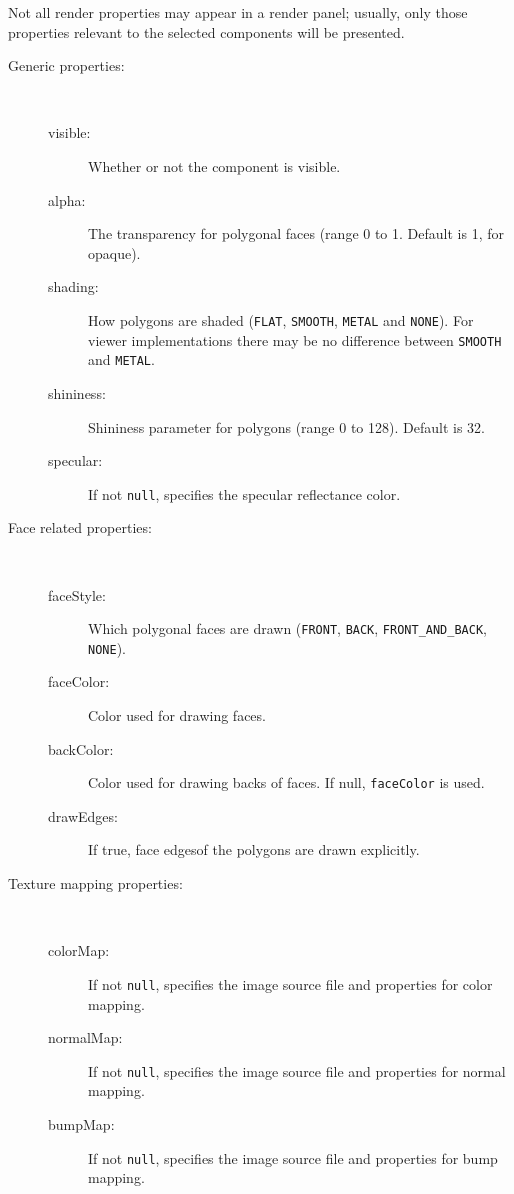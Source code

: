 \documentclass{article}
\begin{document}
Not all render properties may appear in a render panel; usually, only
those properties relevant to the selected components will be
presented.

\begin{description}

\item[Generic properties:]
\hfil \\
\begin{description}
\item[visible:]
Whether or not the component is visible.
\item[alpha:]
The transparency for polygonal faces (range 0 to 1. Default is 1, for
opaque).
\item[shading:] 
How polygons are shaded ({\tt FLAT}, {\tt SMOOTH},
{\tt METAL} and {\tt NONE}).  For viewer implementations there may be no
difference between {\tt SMOOTH} and {\tt METAL}.
\item[shininess:]
Shininess parameter for polygons (range 0 to 128). Default is 32.
\item[specular:]
If not {\tt null}, specifies the specular reflectance color.
\end{description}

\item[Face related properties:]
\hfil \\
\begin{description}
\item[faceStyle:]
Which polygonal faces are drawn ({\tt FRONT}, {\tt BACK},
{\tt FRONT\_AND\_BACK}, {\tt NONE}).
\item[faceColor:] 
Color used for drawing faces.
\item[backColor:]
Color used for drawing backs of faces. If null, {\tt faceColor} is used.
\item[drawEdges:] 	
If true, face edgesof the polygons are drawn explicitly.
\end{description}

\item[Texture mapping properties:]
\hfil \\
\begin{description}
\item[colorMap:]
If not {\tt null}, specifies the image source file and properties
for color mapping.
\item[normalMap:]
If not {\tt null}, specifies the image source file and properties
for normal mapping.
\item[bumpMap:]
If not {\tt null}, specifies the image source file and properties
for bump mapping.
\end{description}


\end{description}
\end{document}
